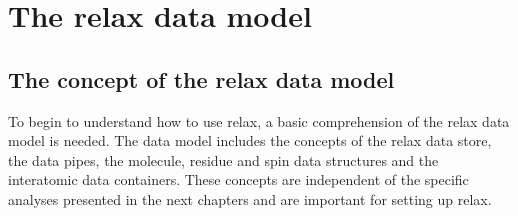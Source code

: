 


\chapter{The relax data model} \label{ch: data model}



\section{The concept of the relax data model}

To begin to understand how to use relax, a basic comprehension of the relax data model is needed.
The data model includes the concepts of the relax data store, the data pipes, the molecule, residue and spin data structures and the interatomic data containers.
These concepts are independent of the specific analyses presented in the next chapters and are important for setting up relax.



